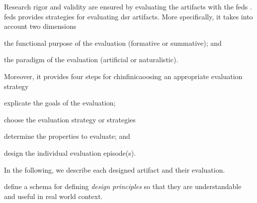 Research rigor and validity are ensured by evaluating the artifacts with the \gls{feds} \citep{Venable2016}. \Gls{feds} provides strategies for evaluating \gls{dsr} artifacts. More specifically, it takes into account two dimensions
\begin{inparaenum}[\itshape i)]
	\item the functional purpose of the
	evaluation (formative or summative); and 
	\item the paradigm of the evaluation (artificial or naturalistic).
\end{inparaenum} 
Moreover, it provides four steps for chinfinicaoosing an appropriate evaluation strategy
\begin{inparaenum}[\itshape i)]
	\item explicate the goals of the evaluation;
	\item choose the evaluation strategy or strategies
	\item determine the properties to evaluate; and
	\item design the individual evaluation episode(s). 
\end{inparaenum} In the following, we describe each designed artifact and their evaluation. 

\cite{Gregor2020} define a schema for defining \emph{design principles} so that they are understandable and useful in real world context. 




%

